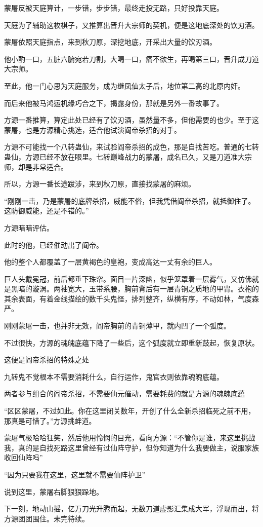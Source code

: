 \begin{this_body}
蒙屠反被天庭算计，一步错，步步错，最终走投无路，只好投靠天庭。

天庭为了辅助这枚棋子，又推算出晋升大宗师的契机，便是这地底深处的饮刃酒。

蒙屠依照天庭指点，来到秋刀原，深挖地底，开采出大量的饮刃酒。

他小酌一口，五脏六腑宛若刀割，大喝一口，痛不欲生，再喝第三口，晋升成刀道大宗师。

至此，他一门心思为天庭服务，成为继凤仙太子后，地位第二高的北原内奸。

而后来他被马鸿运机缘巧合之下，揭露身份，那就是另外一番故事了。

方源一番推算，算定此处已经有了饮刃酒，虽然量不多，但他需要的也少。至于这蒙屠，也是方源精心挑选，适合他试演阎帝杀招的对手。

方源不可能找一个八转蛊仙，来试验阎帝杀招的成色，那是自找苦吃。普通的七转蛊仙，方源已经不放在眼里。七转巅峰战力的蒙屠，成名已久，又是刀道准大宗师，却是非常适合。

所以，方源一番长途跋涉，来到秋刀原，直接找蒙屠的麻烦。

“刚刚一击，乃是蒙屠的底牌杀招，威能不俗，但我凭借阎帝杀招，就抵御住了。这防御威能，还是不错的。”

方源暗暗评估。

此时的他，已经催动出了阎帝。

他的整个人都覆盖了一层黄褐色的皇袍，变成高达一丈有余的巨人。

巨人头戴冕冠，前后都垂下珠帘。面目一片深幽，似乎笼罩着一层雾气，又仿佛就是黑暗的漩涡。两袖宽大，玉带系腰，胸前背后有一层青铜之质地的甲胄。衣袍的其余表面，有着金线描绘的数千头鬼怪，排列整齐，纵横有序，不动如林，气度森严。

刚刚蒙屠一击，也并非无效，阎帝胸前的青铜薄甲，就内凹了一个弧度。

不过很快，方源的魂魄底蕴下降了一些后，这个弧度就立即重新鼓起，恢复原状。

这便是阎帝杀招的特殊之处

九转鬼不觉根本不需要消耗什么，自行运作，鬼官衣则依靠魂魄底蕴。

两者参与组合的阎帝杀招，不需要仙元催动，需要耗费的就是方源的魂魄底蕴

“区区蒙屠，不过如此。你在这里闭关数年，开创了什么全新杀招临死之前不用，那真是可惜了。”方源挑衅道。

蒙屠气极哈哈狂笑，然后他用怜悯的目光，看向方源：“不管你是谁，来这里挑战我，真的是自找死路这里曾经有过仙阵守护，但你知道为什么我要做主，说服家族收回仙阵吗”

“因为只要我在这里，这里就不需要仙阵护卫”

说到这里，蒙屠右脚狠狠跺地。

下一刻，地动山摇，亿万刀光升腾而起，无数刀道虚影汇集成大军，浮现而出，将方源团团围住。未完待续。

\end{this_body}

